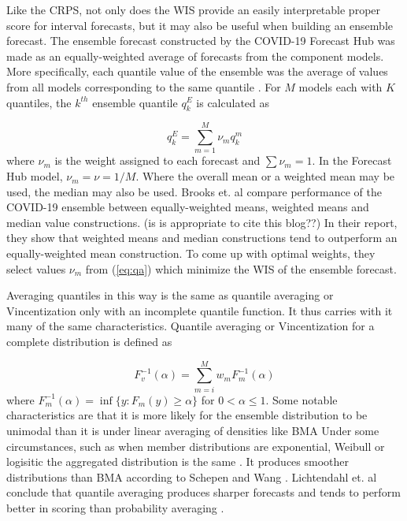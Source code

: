 \documentclass[11pt,notitlepage]{isuthesis}
\begin{document}
Like the CRPS, not only does the WIS provide an easily interpretable proper 
score for interval forecasts, but it may also be useful when building an 
ensemble forecast.
The ensemble forecast constructed by the COVID-19 Forecast Hub was made as an
equally-weighted average of forecasts from the component models. More 
specifically, each quantile value of the ensemble was the average of values from
all models corresponding to the same quantile \cite{ray2020ensemble}. For $M$ 
models each with $K$ quantiles, the $k^{th}$ ensemble quantile $q^E_k$ is 
calculated as

\begin{equation}
\label{eq:qa}
  q^E_k = \sum_{m=1}^M \nu_m q_k^m 
\end{equation}
where $\nu_m$ is the weight assigned to each forecast and $\sum \nu_m = 1$. In
the Forecast Hub model, $\nu_m = \nu = 1/M$. Where the overall mean or a
weighted mean may be used, the median may also be used.
Brooks et. al compare performance of the COVID-19 ensemble
between equally-weighted means, weighted means and median value constructions.
\cite{brooks2020comparing} (is is appropriate to cite this blog??)
In their report, they show that weighted means and median constructions tend
to outperform an equally-weighted mean construction. To come up with optimal 
weights, they select values $\nu_m$ from (\ref{eq:qa}) which minimize the WIS of 
the ensemble forecast.

Averaging quantiles in this way is the same as quantile averaging or Vincentization
only with an incomplete quantile function. It thus carries with it many of the
same characteristics.
Quantile averaging or Vincentization for a complete distribution is defined as 

\begin{equation}
\label{eq:vinc}
  F_v^{-1}(\alpha) = \sum_{m=i}^M w_m F_m^{-1} (\alpha)
\end{equation}
where $F_m^{-1} (\alpha) = \inf \{y:F_m(y) \geq \alpha\}$ for 
$0 < \alpha \leq 1$. Some notable characteristics are that it is more likely for
the ensemble distribution
to be unimodal than it is under linear averaging of densities like BMA 
\cite{busetti2017quantile} Under some circumstances, such as when member
distributions are exponential, Weibull or logisitic the aggregated distribution
is the same \cite{ratcliff1979group}. It produces smoother
distributions than BMA according to Schepen and Wang \cite{schepen2015model}.
Lichtendahl et. al conclude that quantile averaging produces sharper forecasts
and tends to perform better in scoring than probability averaging
\cite{lichtendahl2013better}.
\end{document}
